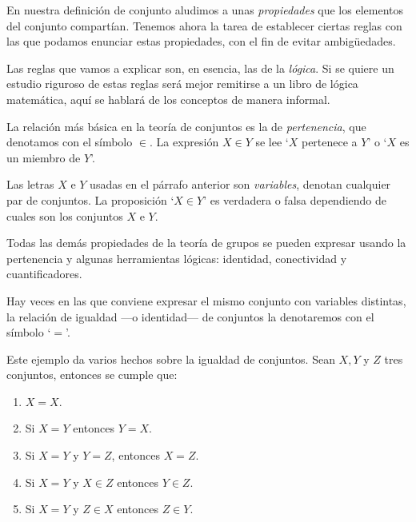 En nuestra definición de conjunto aludimos a unas \textit{propiedades} que los elementos del conjunto compartían. Tenemos ahora la tarea de establecer ciertas reglas con las que podamos enunciar estas propiedades, con el fin de evitar ambigüedades. 

Las reglas que vamos a explicar son, en esencia, las de la \textit{lógica}. Si se quiere un estudio riguroso de estas reglas será mejor remitirse a un libro de lógica matemática, aquí se hablará de los conceptos de manera informal.

La relación más básica en la teoría de conjuntos es la de \textit{pertenencia}, que denotamos con el símbolo $\in$. La expresión $X\in Y$ se lee `$X$ pertenece a $Y$' o `$X$ es un miembro de $Y$'.

Las letras $X$ e $Y$ usadas en el párrafo anterior son \textit{variables}, denotan cualquier par de conjuntos. La proposición `$X\in Y$' es verdadera o falsa dependiendo de cuales son los conjuntos $X$ e $Y$.

Todas las demás propiedades de la teoría de grupos se pueden expresar usando la pertenencia y algunas herramientas lógicas: identidad, conectividad y cuantificadores.

Hay veces en las que conviene expresar el mismo conjunto con variables distintas, la relación de igualdad ---o identidad--- de conjuntos la denotaremos con el símbolo `$=$'.

\begin{ejem}
	Este ejemplo da varios hechos sobre la igualdad de conjuntos. Sean $X,Y$ y $Z$ tres conjuntos, entonces se cumple que:
	\begin{enumerate}
		\item $X=X$.
		\item Si $X=Y$ entonces $Y=X$.
		\item Si $X=Y$ y $Y=Z$, entonces $X=Z$. 
		\item Si $X=Y$ y $X\in Z$ entonces $Y\in Z$.
		\item Si $X=Y$ y $Z\in X$ entonces $Z\in Y$.
	\end{enumerate}
\end{ejem}
